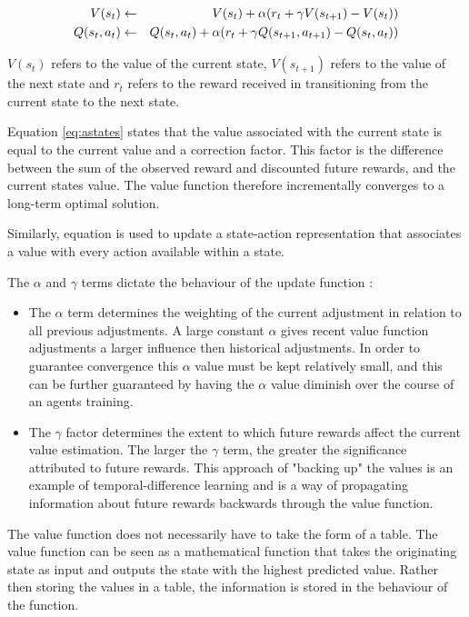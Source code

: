 \documentclass{rucsthesis}
\begin{document}
\begin{eqnarray}
\centering
V(s_t) & \leftarrow & V(s_t) + \alpha(r_{t} + \gamma V(s_{t+1}) - V(s_t)) \label{eq:astates} \\
Q(s_t,a_t) & \leftarrow & Q(s_t,a_t) + \alpha(r_{t} + \gamma Q(s_{t+1},a_{t+1}) - Q(s_t,a_t)) \label{eq:sarsa}
\end{eqnarray}

$V(s_t)$ refers to the value of the current state, $V(s_{t+1})$ refers to the value of the next state and $r_t$ refers to the reward received in transitioning from the current state to the next state.

Equation \ref{eq:astates} states that the value associated with the current state is equal to the current value and a correction factor. This factor is the difference between the sum of the observed reward and discounted future rewards, and the current states value. The value function therefore incrementally converges to a long-term optimal solution.

Similarly, equation \label{eq:sarsa} is used to update a state-action representation that associates a value with every action available within a state.

The $\alpha$ and $\gamma$ terms dictate the behaviour of the update function :

\begin{itemize}
\item{The $\alpha$ term determines the weighting of the current adjustment in relation to all previous adjustments. A large constant $\alpha$ gives recent value function adjustments a larger influence then historical adjustments. In order to guarantee convergence this $\alpha$ value must be kept relatively small, and this can be further guaranteed by having the $\alpha$ value diminish over the course of an agents training.}
\item{The $\gamma$ factor determines the extent to which future rewards affect the current value estimation. The larger the $\gamma$ term, the greater the significance attributed to future rewards. This approach of "backing up" the values is an example of temporal-difference learning\citep{suttonbarto} and is a way of propagating information about future rewards backwards through the value function.}
\end{itemize}

The value function does not necessarily have to take the form of a table. The value function can be seen as a mathematical function that takes the originating state as input and outputs the state with the highest predicted value. Rather then storing the values in a table, the information is stored in the behaviour of the function.
\end{document}
